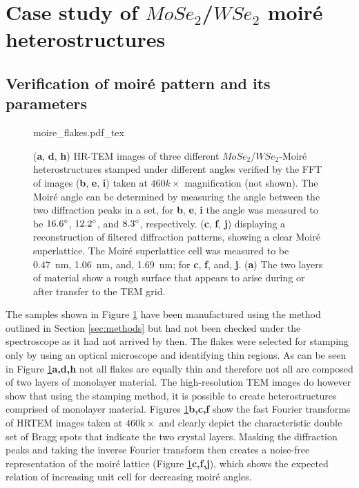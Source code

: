 \section{Case study of $MoSe_2$/$WSe_2$ moiré heterostructures}
\label{sec:results}

\subsection{Verification of moiré pattern and its parameters}

\begin{figure}[p]
    \centering
    \def\svgwidth{.9\linewidth}
    {moire_flakes.pdf_tex}
    \caption{(\textbf{a}, \textbf{d}, \textbf{h}) HR-TEM images of three different $MoSe_2$/$WSe_2$-Moiré heterostructures stamped under different angles verified by the FFT of images (\textbf{b}, \textbf{e}, \textbf{i}) taken at $460k\times$ magnification (not shown). The Moiré angle can be determined by measuring the angle between the two diffraction peaks in a set, for \textbf{b}, \textbf{e}, \textbf{i} the angle was measured to be $16.6\degree$, $12.2\degree$, and $8.3\degree$, respectively. (\textbf{c}, \textbf{f}, \textbf{j}) displaying a reconstruction of filtered diffraction patterns, showing a clear Moiré superlattice. The Moiré superlattice cell was measured to be \SI{0.47}{nm}, \SI{1.06}{nm}, and, \SI{1.69}{nm}; for \textbf{c}, \textbf{f}, and, \textbf{j}. (\textbf{a}) The two layers of material show a rough surface that appears to arise during or after transfer to the TEM grid.}
    \label{fig:moire_overview}
\end{figure}

The samples shown in Figure \ref{fig:moire_overview} have been manufactured using the method outlined in Section \ref{sec:methods} but had not been checked under the spectroscope as it had not arrived by then. The flakes were selected for stamping only by using an optical microscope and identifying thin regions. As can be seen in Figure \ref{fig:moire_overview}\textbf{a,d,h} not all flakes are equally thin and therefore not all are composed of two layers of monolayer material. The high-resolution TEM images do however show that using the stamping method, it is possible to create heterostructures comprised of monolayer material. Figures \ref{fig:moire_overview}\textbf{b,c,f} show the fast Fourier transforms of HRTEM images taken at $460\mathrm{k}\times$ and clearly depict the characteristic double set of Bragg spots that indicate the two crystal layers. Masking the diffraction peaks and taking the inverse Fourier transform then creates a noise-free representation of the moiré lattice (Figure \ref{fig:moire_overview}\textbf{c,f,j}), which shows the expected relation of increasing unit cell for decreasing moiré angles.


